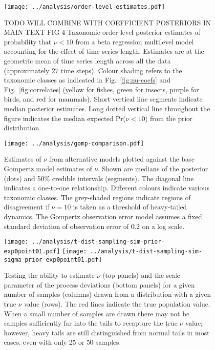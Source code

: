 \clearpage

\begin{figure}[htbp]
\begin{center}
\texttt{[image: ../analysis/order-level-estimates.pdf]}
\caption{
TODO WILL COMBINE WITH COEFFICIENT POSTERIORS IN MAIN TEXT FIG 4
  Taxonomic-order-level posterior estimates of probability that $\nu < 10$ from
  a beta regression multilevel model accounting for the effect of time-series
  length. Estimates are at the geometric mean of time series length across all
  the data (approximately 27 time steps). Colour shading refers to the
  taxonomic classes as indicated in Fig.~\ref{fig:nu-coefs} and
  Fig.~\ref{fig:correlates} (yellow for fishes, green for insects, purple for
  birds, and red for mammals). Short vertical line segments indicate median
  posterior estimates. Long dotted vertical line throughout the figure
  indicates the median expected Pr($\nu < 10$) from the prior distribution.
}
\label{fig:order-estimates}
\end{center}
\end{figure}

\clearpage

\begin{figure}[htbp]
\begin{center}
\texttt{[image: ../analysis/gomp-comparison.pdf]}
\caption{
  Estimates of $\nu$ from alternative models plotted against the base Gompertz
  model estimates of $\nu$. Shown are medians of the posterior (dots) and 50\%
  credible intervals (segments). The diagonal line indicates a one-to-one
  relationship. Different colours indicate various taxonomic classes. The
  grey-shaded regions indicate regions of disagreement if $\nu = 10$ is taken
  as a threshold of heavy-tailed dynamics. The Gompertz observation error model
  assumes a fixed standard deviation of observation error of $0.2$ on a log
  scale.
}
\label{fig:alt}
\end{center}
\end{figure}

\clearpage

\begin{figure}[htbp]
\begin{center}
\texttt{[image: ../analysis/t-dist-sampling-sim-prior-exp0point01.pdf]}
\texttt{[image: ../analysis/t-dist-sampling-sim-sigma-prior-exp0point01.pdf]}
\caption{
  Testing the ability to estimate $\nu$ (top panels) and the scale parameter of
  the process deviations (bottom panels) for a given number of samples (columns)
  drawn from a distribution with a given true $\nu$ value (rows). The red lines
  indicate the true population value. When a small number of samples are drawn
  there may not be samples sufficiently far into the tails to recapture the
  true $\nu$ value; however, heavy tails are still distinguished from normal
  tails in most cases, even with only 25 or 50 samples.
}
\label{fig:sim-nu}
\end{center}
\end{figure}

